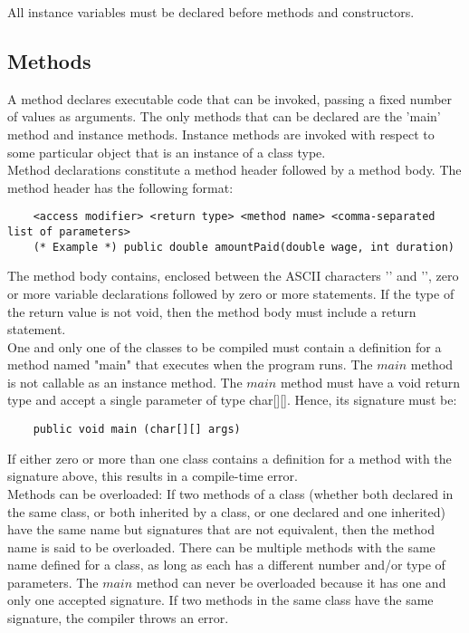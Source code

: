\begin{homeworkProblem}
	All instance variables must be declared before methods and constructors. 
	
	\subsection{Methods}
	A method declares executable code that can be invoked, passing a fixed number of values as arguments. The only methods that can be declared are the 'main' method and instance methods. Instance methods are invoked with respect to some particular object that is an instance of a class type.\\
	
	Method declarations constitute a method header followed by a method body. The method header has the following format:
	\begin{verbatim}
	<access modifier> <return type> <method name> <comma-separated list of parameters>
	(* Example *) public double amountPaid(double wage, int duration)
	\end{verbatim}
	
	The method body contains, enclosed between the ASCII characters '\textbraceleft' and '\textbraceright', zero or more variable declarations followed by zero or more statements. If the type of the return value is not void, then the method body must include a return statement.\\
	
	One and only one of the classes to be compiled must contain a definition for a method named "main" that executes when the program runs. The $main$ method is not callable as an instance method. The $main$ method must have a void return type and accept a single parameter of type char[][]. Hence, its signature must be:
	\begin{verbatim}
	public void main (char[][] args)
	\end{verbatim}
	
	If either zero or more than one class contains a definition for a method with the signature above, this results in a compile-time error.\\
	
	Methods can be overloaded: If two methods of a class (whether both declared in the same class, or both inherited by a class, or one declared and one inherited) have the same name but signatures that are not equivalent, then the method name is said to be overloaded. There can be multiple methods with the same name defined for a class, as long as each has a different number and/or type of parameters. The $main$ method can never be overloaded because it has one and only one accepted signature. If two methods in the same class have the same signature, the compiler throws an error.\\
	

\end{homeworkProblem}
